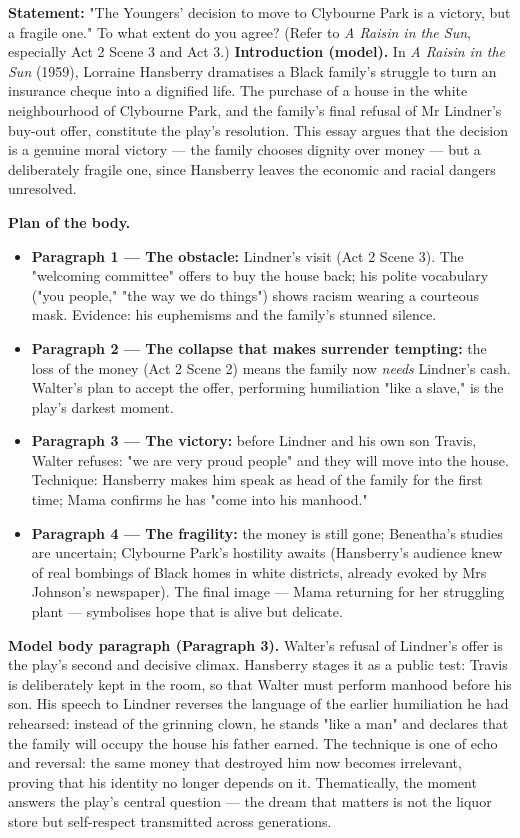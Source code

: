 \documentclass[11pt]{article}
\newcommand{\cle}[1]{{\popxbold\color{popdark}#1}}
\begin{document}
\begin{exoresolu}
\textbf{Statement:} "The Youngers' decision to move to Clybourne Park is a victory, but a fragile one." To what extent do you agree? (Refer to \emph{A Raisin in the Sun}, especially Act 2 Scene 3 and Act 3.)
\tcblower
\textbf{Introduction (model).} In \emph{A Raisin in the Sun} (1959), Lorraine Hansberry dramatises a Black family's struggle to turn an insurance cheque into a dignified life. The purchase of a house in the white neighbourhood of Clybourne Park, and the family's final refusal of Mr Lindner's buy-out offer, constitute the play's resolution. This essay argues that the decision is a genuine moral victory — the family chooses dignity over money — but a deliberately fragile one, since Hansberry leaves the economic and racial dangers unresolved.

\textbf{Plan of the body.}
\begin{itemize}
\item \textbf{Paragraph 1 — The obstacle:} Lindner's visit (Act 2 Scene 3). The "welcoming committee" offers to buy the house back; his polite vocabulary ("you people," "the way we do things") shows racism wearing a courteous mask. Evidence: his euphemisms and the family's stunned silence.
\item \textbf{Paragraph 2 — The collapse that makes surrender tempting:} the loss of the money (Act 2 Scene 2) means the family now \emph{needs} Lindner's cash. Walter's plan to accept the offer, performing humiliation "like a slave," is the play's darkest moment.
\item \textbf{Paragraph 3 — The victory:} before Lindner and his own son Travis, Walter refuses: "we are very proud people" and they will move into the house. Technique: Hansberry makes him speak as head of the family for the first time; Mama confirms he has "come into his manhood."
\item \textbf{Paragraph 4 — The fragility:} the money is still gone; Beneatha's studies are uncertain; Clybourne Park's hostility awaits (Hansberry's audience knew of real bombings of Black homes in white districts, already evoked by Mrs Johnson's newspaper). The final image — Mama returning for her struggling plant — symbolises hope that is alive but delicate.
\end{itemize}

\textbf{Model body paragraph (Paragraph 3).} Walter's refusal of Lindner's offer is the play's second and decisive climax. Hansberry stages it as a public test: Travis is deliberately kept in the room, so that Walter must perform manhood before his son. His speech to Lindner reverses the language of the earlier humiliation he had rehearsed: instead of the grinning clown, he stands "like a man" and declares that the family will occupy the house his father earned. The technique is one of \cle{echo and reversal}: the same money that destroyed him now becomes irrelevant, proving that his identity no longer depends on it. Thematically, the moment answers the play's central question — the dream that matters is not the liquor store but self-respect transmitted across generations.


\end{exoresolu}
\end{document}
